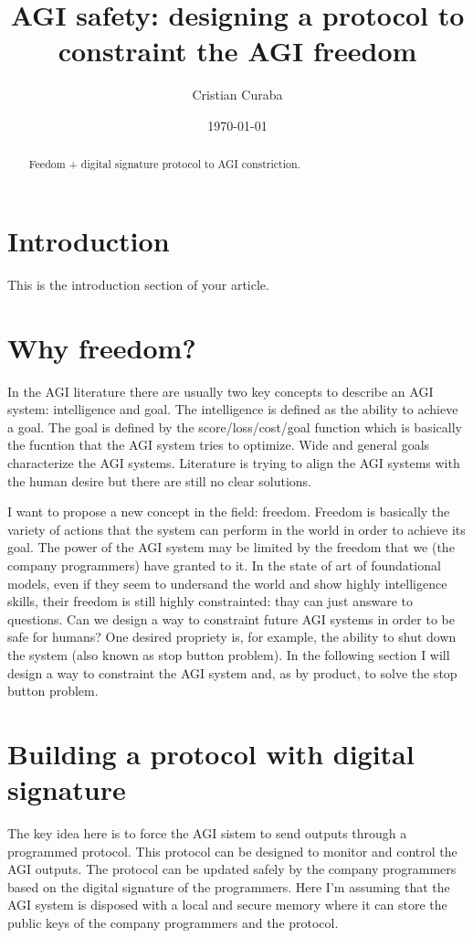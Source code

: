 \documentclass{article}
\begin{document}
\title{AGI safety: designing a protocol to constraint the AGI freedom}
\author{Cristian Curaba}
\date{\today}

\maketitle

\begin{abstract}
Feedom + digital signature protocol to AGI constriction.
\end{abstract}

\section{Introduction}
This is the introduction section of your article.

\section{Why freedom?}
In the AGI literature there are usually two key concepts to describe an AGI system: intelligence and goal.
The intelligence is defined as the ability to achieve a goal.
The goal is defined by the score/loss/cost/goal function which is basically the fucntion that the AGI system tries to optimize.
Wide and general goals characterize the AGI systems.
Literature is trying to align the AGI systems with the human desire but there are still no clear solutions.

I want to propose a new concept in the field: freedom. 
Freedom is basically the variety of actions that the system can perform in the world in order to achieve its goal.
The power of the AGI system may be limited by the freedom that we (the company programmers) have granted to it.
In the state of art of foundational models, even if they seem to undersand the world and show highly intelligence skills, their freedom is still highly constrainted: thay can just answare to questions.
Can we design a way to constraint future AGI systems in order to be safe for humans?
One desired propriety is, for example, the ability to shut down the system (also known as stop button problem).
In the following section I will design a way to constraint the AGI system and, as by product, to solve the stop button problem.

\section{Building a protocol with digital signature}
The key idea here is to force the AGI sistem to send outputs through a programmed protocol.
This protocol can be designed to monitor and control the AGI outputs.
The protocol can be updated safely by the company programmers based on the digital signature of the programmers. 
Here I'm assuming that the AGI system is disposed with a local and secure memory where it can store the public keys of the company programmers and the protocol.
\end{document}
